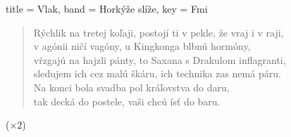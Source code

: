 \begin{song}[
    remember-chords = true ,
    verse/numbered = true ,
    transpose-capo = true
  ]{
    title = Vlak,
    band = Horkýže slíže,
    key  = Fmi
  }
    \begin{verse}
    Rýchlik na tretej koľaji, postojí ti v pekle, že vraj i v raji, \\
    v agónii ničí vagóny, u Kingkonga blbnú hormóny, \\
    vŕzgajú na hajzli pánty, to Saxana s Drakulom inflagranti, \\
    sledujem ich cez malú škáru, ich technika zas nemá páru. \\
    Na konci bola svadba pol kráľovstva do daru, \\
    tak decká do postele, vaši chcú ísť do baru.
    \end{verse}

    \begin{chorus}
    ($\times2$)
    \end{chorus}

\end{song}